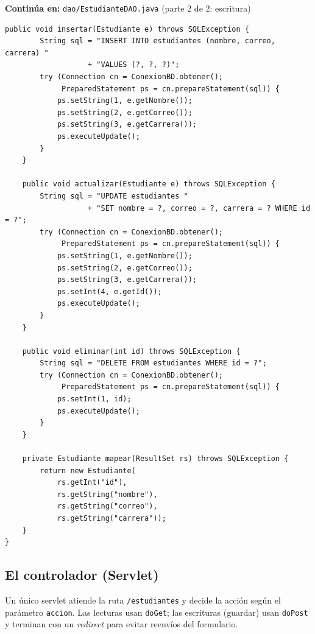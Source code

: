 {\small\textbf{Continúa en:} \texttt{dao/EstudianteDAO.java} (parte 2 de 2: escritura)}
\begin{lstlisting}[style=java,caption={EstudianteDAO.java --- parte 2: insertar, actualizar, eliminar},label={lst:jsp-dao-b}]
    public void insertar(Estudiante e) throws SQLException {
        String sql = "INSERT INTO estudiantes (nombre, correo, carrera) "
                   + "VALUES (?, ?, ?)";
        try (Connection cn = ConexionBD.obtener();
             PreparedStatement ps = cn.prepareStatement(sql)) {
            ps.setString(1, e.getNombre());
            ps.setString(2, e.getCorreo());
            ps.setString(3, e.getCarrera());
            ps.executeUpdate();
        }
    }

    public void actualizar(Estudiante e) throws SQLException {
        String sql = "UPDATE estudiantes "
                   + "SET nombre = ?, correo = ?, carrera = ? WHERE id = ?";
        try (Connection cn = ConexionBD.obtener();
             PreparedStatement ps = cn.prepareStatement(sql)) {
            ps.setString(1, e.getNombre());
            ps.setString(2, e.getCorreo());
            ps.setString(3, e.getCarrera());
            ps.setInt(4, e.getId());
            ps.executeUpdate();
        }
    }

    public void eliminar(int id) throws SQLException {
        String sql = "DELETE FROM estudiantes WHERE id = ?";
        try (Connection cn = ConexionBD.obtener();
             PreparedStatement ps = cn.prepareStatement(sql)) {
            ps.setInt(1, id);
            ps.executeUpdate();
        }
    }

    private Estudiante mapear(ResultSet rs) throws SQLException {
        return new Estudiante(
            rs.getInt("id"),
            rs.getString("nombre"),
            rs.getString("correo"),
            rs.getString("carrera"));
    }
}
\end{lstlisting}

\subsection{El controlador (Servlet)}
\label{ap:crud:jsp:servlet}

Un único servlet atiende la ruta \texttt{/estudiantes} y decide la
acción según el parámetro \texttt{accion}. Las lecturas usan
\texttt{doGet}; las escrituras (guardar) usan \texttt{doPost} y
terminan con un \emph{redirect} para evitar reenvíos del formulario.

